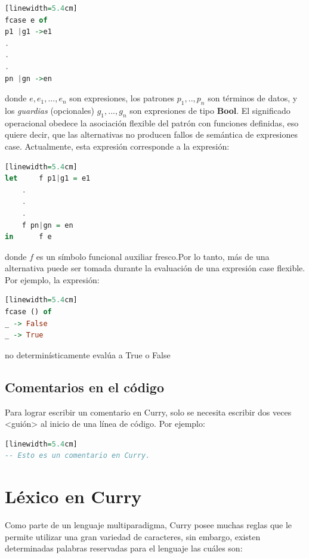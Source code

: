 \documentclass[10pt,journal,compsoc]{IEEEtran}
\begin{document}
\begin{lstlisting}[language=Haskell, caption = {Expresi\'on case flexible}][linewidth=5.4cm]
fcase e of
p1 |g1 ->e1
.
.
.
pn |gn ->en
\end{lstlisting}

donde $e,e_{1},...,e_{n}$ son expresiones, los patrones $p_{1},..,p_{n}$ son t\'erminos de datos, y los \emph{guardias} (opcionales) $g_{1},...,g_{n}$ son expresiones de tipo \textbf{Bool}. El significado operacional obedece la asociaci\'on flexible del patr\'on con funciones definidas, eso quiere decir, que las alternativas no producen fallos de sem\'antica de expresiones case. Actualmente, esta expresi\'on corresponde a la expresi\'on:

\begin{lstlisting}[language=Haskell, caption = {Expresi\'on case flexible con el uso de 'let'-'in'}][linewidth=5.4cm]
let 	f p1|g1 = e1 
	.
	.
	.
	f pn|gn = en 
in  	f e
\end{lstlisting}
donde $f$ es un s\'imbolo funcional auxiliar fresco.Por lo tanto, m\'as de una alternativa puede ser tomada durante la evaluaci\'on de una expresi\'on case flexible.  Por ejemplo, la expresi\'on:  

\begin{lstlisting}[language=Haskell, caption = {Evaluaci\'on m\'ultiple en }][linewidth=5.4cm]
fcase () of 
_ -> False
_ -> True
\end{lstlisting}
no determin\'isticamente eval\'ua a True o False

\subsection{Comentarios en el c\'odigo}
Para lograr escribir un comentario en Curry, solo se necesita escribir dos veces <gui\'on> al inicio de una l\'inea de c\'odigo. Por ejemplo:

\begin{lstlisting}[language=Haskell, caption = {Ejemplo de comentairo de c\'odigo en Curry. }][linewidth=5.4cm]
-- Esto es un comentario en Curry. 
\end{lstlisting}

\section{L\'exico en Curry}
Como parte de un lenguaje multiparadigma, Curry posee muchas reglas que le permite utilizar una gran variedad de caracteres, sin embargo, existen determinadas palabras reservadas para el lenguaje las cu\'ales son: 
\end{document}
